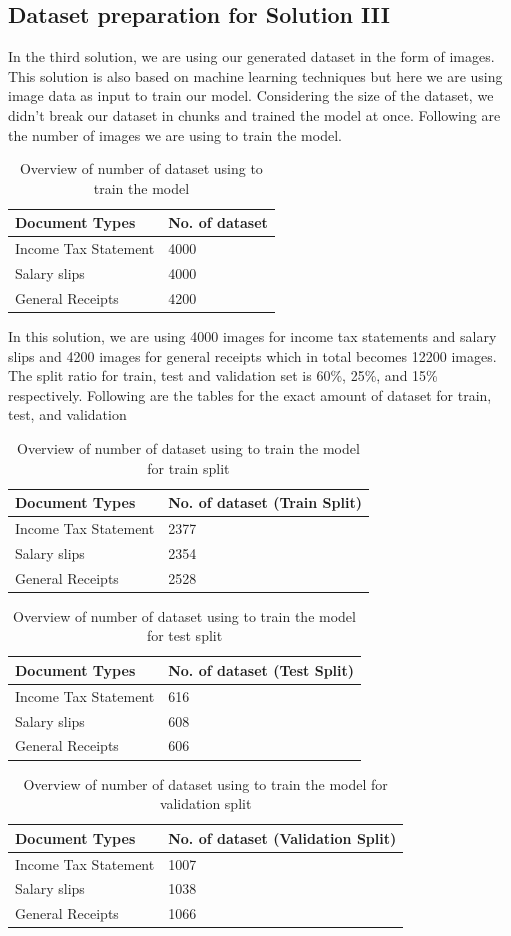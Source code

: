 \subsection{Dataset preparation for Solution III}
In the third solution, we are using our generated dataset in the form of images. This solution is also based on machine learning techniques but here we are using image data as input to train our model. Considering the size of the dataset, we didn't break our dataset in chunks and trained the model at once. Following are the number of images we are using to train the model. 
\begin{table}[H]
\centering
\begin{tabular}{l | l }
Document Types & No. of dataset\\
\hline
Income Tax Statement & 4000 \\
Salary slips & 4000 \\
General Receipts & 4200
\end{tabular}
\caption{Overview of number of dataset using to train the model}
\label{dataset_count_sol3}
\end{table}
\par
In this solution, we are using 4000 images for income tax statements and salary slips and 4200 images for general receipts which in total becomes 12200 images. The split ratio for train, test and validation set is 60\%, 25\%, and 15\% respectively. Following are the tables for the exact amount of dataset for train, test, and validation
\begin{table}[H]
\centering
\begin{tabular}{l | l }
Document Types & No. of dataset (Train Split)\\
\hline
Income Tax Statement & 2377 \\
Salary slips & 2354 \\
General Receipts & 2528
\end{tabular}
\caption{Overview of number of dataset using to train the model for train split}
\label{dataset_count_sol3_training}
\end{table}
\begin{table}[H]
\centering
\begin{tabular}{l | l }
Document Types & No. of dataset (Test Split)\\
\hline
Income Tax Statement & 616 \\
Salary slips & 608 \\
General Receipts & 606
\end{tabular}
\caption{Overview of number of dataset using to train the model for test split}
\label{dataset_count_sol3_test}
\end{table}
\begin{table}[H]
\centering
\begin{tabular}{l | l }
Document Types & No. of dataset (Validation Split)\\
\hline
Income Tax Statement & 1007 \\
Salary slips & 1038 \\
General Receipts & 1066
\end{tabular}
\caption{Overview of number of dataset using to train the model for validation split}
\label{dataset_count_sol3_validation}
\end{table}
